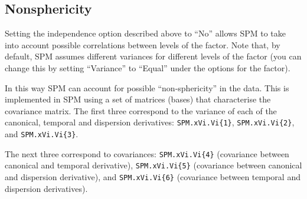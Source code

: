 \subsection{Nonsphericity}

Setting the independence option described above to ``No'' allows SPM to take into account possible correlations between levels of the factor. Note that, by default, SPM assumes different variances for different levels of the factor (you can change this by setting ``Variance'' to ``Equal'' under the options for the factor). 

In this way SPM can account for possible ``non-sphericity'' in the data. This is implemented in SPM using a set of matrices (bases) that characterise the covariance matrix. The first three correspond to the variance of each of the canonical, temporal and dispersion derivatives:  \texttt{SPM.xVi.Vi\{1\}}, \texttt{SPM.xVi.Vi\{2\}}, and \texttt{SPM.xVi.Vi\{3\}}.

The next three correspond to covariances: \texttt{SPM.xVi.Vi\{4\}} (covariance between canonical and temporal derivative), \texttt{SPM.xVi.Vi\{5\}} (covariance between canonical and dispersion derivative), and \texttt{SPM.xVi.Vi\{6\}} (covariance between temporal and dispersion derivatives).

